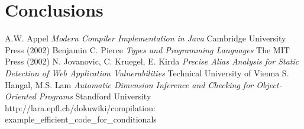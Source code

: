 \documentclass[a4paper]{article}
\begin{document}
\section{Conclusions}


\begin{thebibliography}{99}
  A.W. Appel {\it Modern Compiler Implementation in Java}
    Cambridge University Press (2002)
  Benjamin C. Pierce {\it Types and Programming Languages} The
    MIT Press (2002)
  N. Jovanovic, C. Kruegel, E. Kirda {\it Precise Alias
    Analysis for Static Detection of Web Application Vulnerabilities} Technical
    University of Vienna
  S. Hangal, M.S. Lam {\it Automatic Dimension Inference and
    Checking for Object-Oriented Programs} Standford University
  \mbox{http://lara.epfl.ch/dokuwiki/compilation:}
    \mbox{example\_efficient\_code\_for\_conditionals}
\end{thebibliography}
\end{document}

